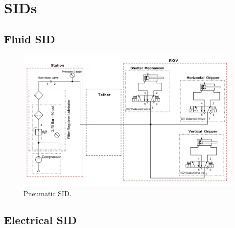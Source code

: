 \section{SIDs} \label{app:sids}

\subsection{Fluid SID} \label{app:fluid_sid}

\begin{figure}[h!]
    \centering
    \includegraphics[width=\columnwidth]{Sections/7Appendicies/images/Pneumatic SID.jpg}
    \caption{Pneumatic SID.}
    \label{fig:pneumatic_sid}
\end{figure}

\subsection{Electrical SID}

